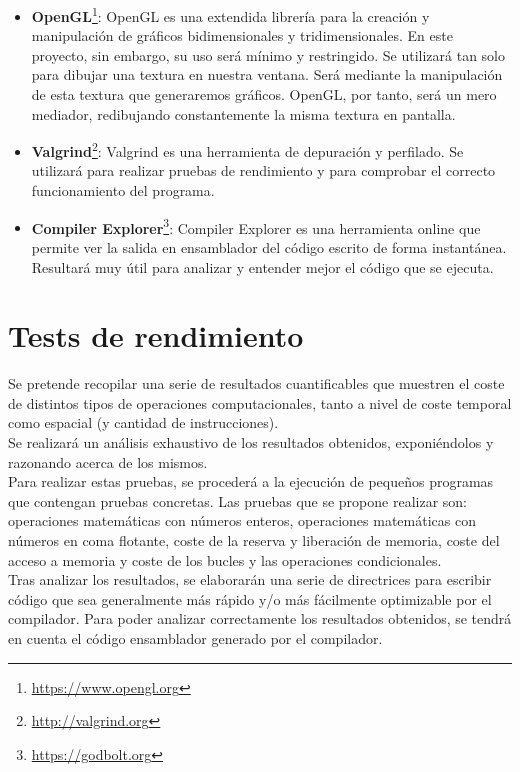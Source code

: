 \begin{itemize}
	\item \textbf{OpenGL}\footnote{\url{https://www.opengl.org}}: OpenGL es una extendida librería para la creación y manipulación de gráficos bidimensionales y tridimensionales. En este proyecto, sin embargo, su uso será mínimo y restringido. Se utilizará tan solo para dibujar una textura en nuestra ventana. Será mediante la manipulación de esta textura que generaremos gráficos. OpenGL, por tanto, será un mero mediador, redibujando constantemente la misma textura en pantalla.
	\item \textbf{Valgrind}\footnote{\url{http://valgrind.org}}: Valgrind es una herramienta de depuración y perfilado. Se utilizará para realizar pruebas de rendimiento y para comprobar el correcto funcionamiento del programa. 
	\item \textbf{Compiler Explorer}\footnote{\url{https://godbolt.org}}: Compiler Explorer es una herramienta online que permite ver la salida en ensamblador del código escrito de forma instantánea. Resultará muy útil para analizar y entender mejor el código que se ejecuta.
\end{itemize}

\section{Tests de rendimiento}

Se pretende recopilar una serie de resultados cuantificables que muestren el coste de distintos tipos de operaciones computacionales, tanto a nivel de coste temporal como espacial (y cantidad de instrucciones).\\

Se realizará un análisis exhaustivo de los resultados obtenidos, exponiéndolos y razonando acerca de los mismos.\\

Para realizar estas pruebas, se procederá a la ejecución de pequeños programas que contengan pruebas concretas. Las pruebas que se propone realizar son: operaciones matemáticas con números enteros, operaciones matemáticas con números en coma flotante, coste de la reserva y liberación de memoria, coste del acceso a memoria y coste de los bucles y las operaciones condicionales.\\

Tras analizar los resultados, se elaborarán una serie de directrices para escribir código que sea generalmente más rápido y/o más fácilmente optimizable por el compilador. Para poder analizar correctamente los resultados obtenidos, se tendrá en cuenta el código ensamblador generado por el compilador.\\

